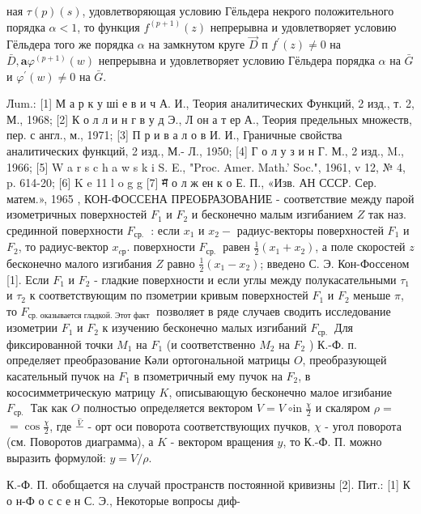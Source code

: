 \documentclass[10pt]{article}
\begin{document}
ная $\tau(p)(s)$, удовлетворяющая условию Гёльдера некрого положительного порядка $\alpha<1$, то функция $f^{(p+1)}(z)$ непрерывна и удовлетворяет условию Гёльдера того же порядка $\alpha$ на замкнутом круге $\vec{D}$ п $f^{\prime}(z) \neq 0$ на $\bar{D}, \mathbf{a} \varphi^{(p+1)}(w)$ непрерывна и удовлетворяет условию Гёльдера порядка $\alpha$ на $\bar{G}$ и $\varphi^{\prime}(w) \neq 0$ на $\bar{G}$.



Лum.: [1] М а р к у ші е в и ч А. И., Теория аналитических Функций, 2 изд., т. 2, М., 1968; [2] К о л л и н г в у д Э., Л он а т ер А., Теория предельных множеств, пер. с англ., м., 1971; [3] П р и в а л о в И. И., Граничные свойства аналитических функций, 2 изд., М.- Л., 1950; [4] Г о л у з и н Г. М., 2 изд., M., 1966; [5] W a r s c h a w s k i S. E., "Proc. Amer. Math.' Soc.", 1961, v 12, № 4, p. 614-20; [6] K e 11 l o g g [7] म̈ о л ж ен к о Е. П., «Изв. АН СССР. Сер. матем.», 1965 , КОН-ФОССЕНА ПРЕОБРАЗОВАНИЕ - соответствие между парой изометричных поверхностей $F_{1}$ и $F_{2}$ и бесконечно малым изгибанием $Z$ так наз. срединной поверхности $F_{\text {ср. }}$ : если $x_{1}$ и $x_{2}-$ радиус-векторы поверхностей $F_{1}$ и $F_{2}$, то радиус-вектор $x_{c р}$. поверхности $F_{\text {ср. }}$ равен $\frac{1}{2}\left(x_{1}+x_{2}\right)$, а поле скоростей $z$ бесконечно малого изгибания $Z$ равно $\frac{1}{2}\left(x_{1}-x_{2}\right)$; введено С. Э. Кон-Фоссеном [1]. Если $F_{1}$ и $F_{2}$ - гладкие поверхности и если углы между полукасательными $\tau_{1}$ и $\tau_{2}$ к соответствующим по пзометрии кривым поверхностей $F_{1}$ и $F_{2}$ меньше $\pi$, то $F_{\text {ср. оказывается гладкой. Этот факт }}$ позволяет в ряде случаев сводить исследование изометрии $F_{1}$ и $F_{2}$ к изучению бесконечно малых изгибаний $F_{\text {ср. }}$ Для фиксированной точки $M_{1}$ на $F_{1}$ (и соответственно $M_{2}$ на $F_{2}$ ) К.-Ф. п. определяет преобразование Кәли ортогональной матрицы $O$, преобразующей касательный пучок на $F_{1}$ в пзометричный ему пучок на $F_{2}$, в кососимметрическую матрицу $K$, описывающую бесконечно малое игзибание $F_{\text {ср. }}$ Так как $O$ полностью определяется вектором $V=V \operatorname{\circ in} \frac{\chi}{2}$ и скаляром $\rho=$ $=\cos \frac{\chi}{2}$, где $\stackrel{\hat{V}}{-}$ - орт оси поворота соответствующих пучков, $\chi$ - угол поворота (см. Поворотов диаграмма), а $K$ - вектором вращения $y$, то К.-Ф. П. можно выразить формулой: $y=V / \rho$.



К.-Ф. П. обобщается на случай пространств постоянной кривизны [2]. Пит.: [1] К о н-Ф о с с е н С. Э., Некоторые вопросы диф-
\end{document}
